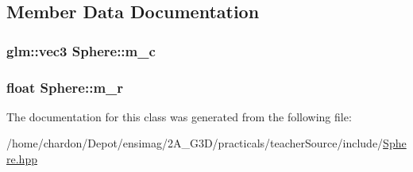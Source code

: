 \subsection{Member Data Documentation}
\hypertarget{classSphere_a2fd875d8cdeaef8fd3551fdf3241c7b1}{
\subsubsection[{m\+\_\+c}]{\setlength{\rightskip}{0pt plus 5cm}glm\+::vec3 Sphere\+::m\+\_\+c\hspace{0.3cm}{\ttfamily [private]}}}\label{classSphere_a2fd875d8cdeaef8fd3551fdf3241c7b1}
\hypertarget{classSphere_a2476da8402053c022436054f108bf8aa}{
\subsubsection[{m\+\_\+r}]{\setlength{\rightskip}{0pt plus 5cm}float Sphere\+::m\+\_\+r\hspace{0.3cm}{\ttfamily [private]}}}\label{classSphere_a2476da8402053c022436054f108bf8aa}


The documentation for this class was generated from the following file\+:\begin{DoxyCompactItemize}
\item 
/home/chardon/\+Depot/ensimag/2\+A\+\_\+\+G3\+D/practicals/teacher\+Source/include/\hyperlink{Sphere_8hpp}{Sphere.\+hpp}\end{DoxyCompactItemize}
